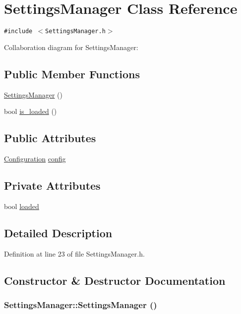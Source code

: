 \hypertarget{classSettingsManager}{
\section{SettingsManager Class Reference}
\label{classSettingsManager}
}
{\tt \#include $<$SettingsManager.h$>$}

Collaboration diagram for SettingsManager:\subsection*{Public Member Functions}
\begin{CompactItemize}
\item 
\hyperlink{classSettingsManager_07295ed235508bb4dcd0e7a040ef01db}{SettingsManager} ()
\item 
bool \hyperlink{classSettingsManager_16e36a836f6e630c63edd28dfc4e61f7}{is\_\-loaded} ()
\end{CompactItemize}
\subsection*{Public Attributes}
\begin{CompactItemize}
\item 
\hyperlink{classConfiguration}{Configuration} \hyperlink{classSettingsManager_99a9134ef5eecd398af9e2e1cb215ee4}{config}
\end{CompactItemize}
\subsection*{Private Attributes}
\begin{CompactItemize}
\item 
bool \hyperlink{classSettingsManager_0b2873bd736197002cfefefb152519ec}{loaded}
\end{CompactItemize}


\subsection{Detailed Description}


Definition at line 23 of file SettingsManager.h.

\subsection{Constructor \& Destructor Documentation}
\hypertarget{classSettingsManager_07295ed235508bb4dcd0e7a040ef01db}{
\subsubsection{\setlength{\rightskip}{0pt plus 5cm}SettingsManager::SettingsManager ()}}
\label{classSettingsManager_07295ed235508bb4dcd0e7a040ef01db}




